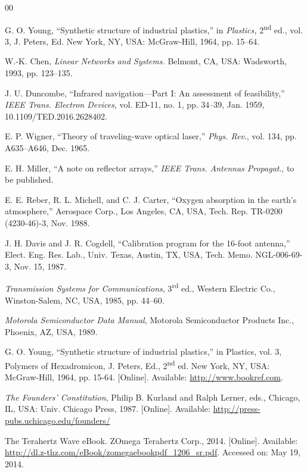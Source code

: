 \documentclass{ieeeaccess}
\begin{document}
\begin{thebibliography}{00}

 G. O. Young, ``Synthetic structure of industrial plastics,'' in \emph{Plastics,} 2\textsuperscript{nd} ed., vol. 3, J. Peters, Ed. New York, NY, USA: McGraw-Hill, 1964, pp. 15--64.

 W.-K. Chen, \emph{Linear Networks and Systems.} Belmont, CA, USA: Wadsworth, 1993, pp. 123--135.

 J. U. Duncombe, ``Infrared navigation---Part I: An assessment of feasibility,'' \emph{IEEE Trans. Electron Devices}, vol. ED-11, no. 1, pp. 34--39, Jan. 1959, 10.1109/TED.2016.2628402.

 E. P. Wigner, ``Theory of traveling-wave optical laser,'' \emph{Phys. Rev}., vol. 134, pp. A635--A646, Dec. 1965.

 E. H. Miller, ``A note on reflector arrays,'' \emph{IEEE Trans. Antennas Propagat}., to be published.

 E. E. Reber, R. L. Michell, and C. J. Carter, ``Oxygen absorption in the earth's atmosphere,'' Aerospace Corp., Los Angeles, CA, USA, Tech. Rep. TR-0200 (4230-46)-3, Nov. 1988.

 J. H. Davis and J. R. Cogdell, ``Calibration program for the 16-foot antenna,'' Elect. Eng. Res. Lab., Univ. Texas, Austin, TX, USA, Tech. Memo. NGL-006-69-3, Nov. 15, 1987.

 \emph{Transmission Systems for Communications}, 3\textsuperscript{rd} ed., Western Electric Co., Winston-Salem, NC, USA, 1985, pp. 44--60.

 \emph{Motorola Semiconductor Data Manual}, Motorola Semiconductor Products Inc., Phoenix, AZ, USA, 1989.

 G. O. Young, ``Synthetic structure of industrial
plastics,'' in Plastics, vol. 3, Polymers of Hexadromicon, J. Peters,
Ed., 2\textsuperscript{nd} ed. New York, NY, USA: McGraw-Hill, 1964, pp. 15-64.
[Online]. Available:
\underline{http://www.bookref.com}.

 \emph{The Founders' Constitution}, Philip B. Kurland
and Ralph Lerner, eds., Chicago, IL, USA: Univ. Chicago Press, 1987.
[Online]. Available: \underline{http://press-pubs.uchicago.edu/founders/}

 The Terahertz Wave eBook. ZOmega Terahertz Corp., 2014.
[Online]. Available:
\underline{http://dl.z-thz.com/eBook/zomegaebookpdf\_1206\_sr.pdf}. Accessed on: May 19, 2014.


\end{thebibliography}
\end{document}
